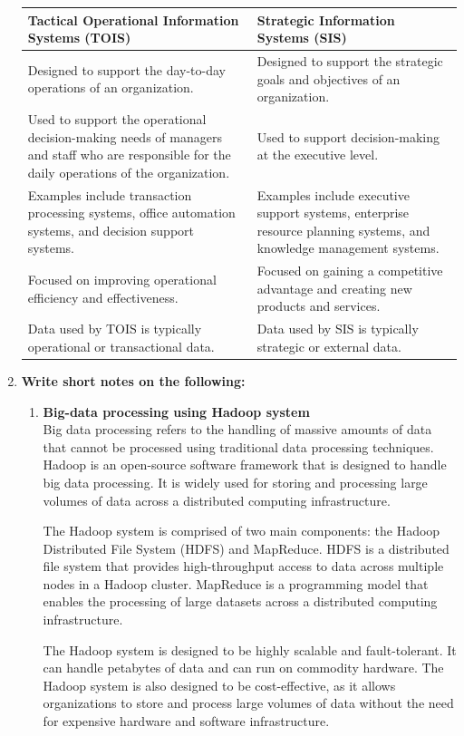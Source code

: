 \documentclass[12pt]{article}
\begin{document}
\begin{enumerate}
\begin{longtable}{|p{6cm}|p{6cm}|}
\hline
\textbf{Tactical Operational Information Systems (TOIS)} & \textbf{Strategic Information Systems (SIS)} \\
\hline
Designed to support the day-to-day operations of an organization. & Designed to support the strategic goals and objectives of an organization. \\
\hline
Used to support the operational decision-making needs of managers and staff who are responsible for the daily operations of the organization. & Used to support decision-making at the executive level. \\
\hline
Examples include transaction processing systems, office automation systems, and decision support systems. & Examples include executive support systems, enterprise resource planning systems, and knowledge management systems. \\
\hline
Focused on improving operational efficiency and effectiveness. & Focused on gaining a competitive advantage and creating new products and services. \\
\hline
Data used by TOIS is typically operational or transactional data. & Data used by SIS is typically strategic or external data. \\
\hline
\end{longtable}
    \item {\bfseries Write short notes on the following:}
    \begin{enumerate}
    \item {\bfseries Big-data processing using Hadoop system\\}
    Big data processing refers to the handling of massive amounts of data that cannot be processed using traditional data processing techniques. Hadoop is an open-source software framework that is designed to handle big data processing. It is widely used for storing and processing large volumes of data across a distributed computing infrastructure.

    The Hadoop system is comprised of two main components: the Hadoop Distributed File System (HDFS) and MapReduce. HDFS is a distributed file system that provides high-throughput access to data across multiple nodes in a Hadoop cluster. MapReduce is a programming model that enables the processing of large datasets across a distributed computing infrastructure.
    
    The Hadoop system is designed to be highly scalable and fault-tolerant. It can handle petabytes of data and can run on commodity hardware. The Hadoop system is also designed to be cost-effective, as it allows organizations to store and process large volumes of data without the need for expensive hardware and software infrastructure.
    

\end{enumerate}
\end{enumerate}
\end{document}
